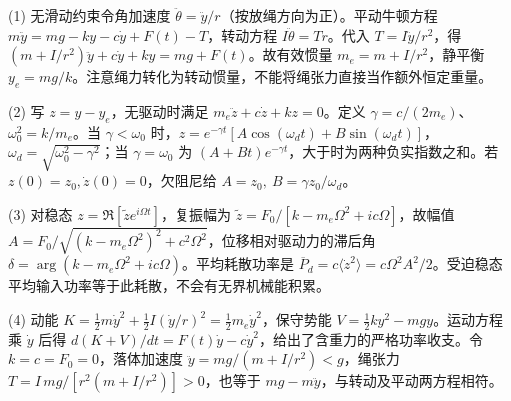 (1) 无滑动约束令角加速度 \(\ddot\theta=\ddot y/r\)（按放绳方向为正）。平动牛顿方程 \(m\ddot y=mg-ky-c\dot y+F(t)-T\)，转动方程 \(I\ddot\theta=Tr\)。代入 \(T=I\ddot y/r^2\)，得 \((m+I/r^2)\ddot y+c\dot y+ky=mg+F(t)\)。故有效惯量 \(m_e=m+I/r^2\)，静平衡 \(y_e=mg/k\)。注意绳力转化为转动惯量，不能将绳张力直接当作额外恒定重量。

(2) 写 \(z=y-y_e\)，无驱动时满足 \(m_e\ddot z+c\dot z+kz=0\)。定义 \(\gamma=c/(2m_e)\)、\(\omega_0^2=k/m_e\)。当 \(\gamma<\omega_0\) 时，\(z=e^{-\gamma t}[A\cos(\omega_dt)+B\sin(\omega_dt)]\)，\(\omega_d=\sqrt{\omega_0^2-\gamma^2}\)；当 \(\gamma=\omega_0\) 为 \((A+Bt)e^{-\gamma t}\)，大于时为两种负实指数之和。若 \(z(0)=z_0,\dot z(0)=0\)，欠阻尼给 \(A=z_0,\ B=\gamma z_0/\omega_d\)。

(3) 对稳态 \(z=\Re[\tilde z e^{i\Omega t}]\)，复振幅为 \(\tilde z=F_0/[k-m_e\Omega^2+ic\Omega]\)，故幅值 \(A=F_0/\sqrt{(k-m_e\Omega^2)^2+c^2\Omega^2}\)，位移相对驱动力的滞后角 \(\delta=\arg(k-m_e\Omega^2+ic\Omega)\)。平均耗散功率是 \(\overline P_d=c\langle\dot z^2\rangle=c\Omega^2A^2/2\)。受迫稳态平均输入功率等于此耗散，不会有无界机械能积累。

(4) 动能 \(K=\frac12m\dot y^2+\frac12I(\dot y/r)^2=\frac12m_e\dot y^2\)，保守势能 \(V=\frac12ky^2-mgy\)。运动方程乘 \(\dot y\) 后得 \(d(K+V)/dt=F(t)\dot y-c\dot y^2\)，给出了含重力的严格功率收支。令 \(k=c=F_0=0\)，落体加速度 \(\ddot y=mg/(m+I/r^2)<g\)，绳张力 \(T=I\,mg/[r^2(m+I/r^2)]>0\)，也等于 \(mg-m\ddot y\)，与转动及平动两方程相符。
